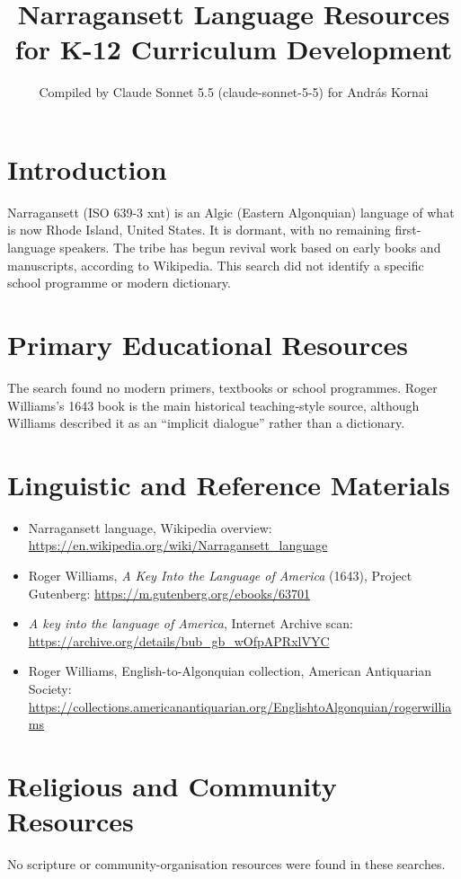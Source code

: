 \documentclass[12pt]{article}
\title{Narragansett Language Resources for K-12 Curriculum Development}
\author{Compiled by Claude Sonnet 5.5 (claude-sonnet-5-5) for Andr\'as Kornai}
\date{}
\begin{document}
\maketitle

\section{Introduction}
Narragansett (ISO 639-3 xnt) is an Algic (Eastern Algonquian) language of what is now Rhode Island, United States. It is dormant, with no remaining first-language speakers. The tribe has begun revival work based on early books and manuscripts, according to Wikipedia. This search did not identify a specific school programme or modern dictionary.

\section{Primary Educational Resources}
The search found no modern primers, textbooks or school programmes. Roger Williams's 1643 book is the main historical teaching-style source, although Williams described it as an ``implicit dialogue'' rather than a dictionary.

\section{Linguistic and Reference Materials}
\begin{itemize}
\item Narragansett language, Wikipedia overview: \url{https://en.wikipedia.org/wiki/Narragansett_language}
\item Roger Williams, \emph{A Key Into the Language of America} (1643), Project Gutenberg: \url{https://m.gutenberg.org/ebooks/63701}
\item \emph{A key into the language of America}, Internet Archive scan: \url{https://archive.org/details/bub_gb_wOfpAPRxlVYC}
\item Roger Williams, English-to-Algonquian collection, American Antiquarian Society: \url{https://collections.americanantiquarian.org/EnglishtoAlgonquian/rogerwilliams}
\end{itemize}

\section{Religious and Community Resources}
No scripture or community-organisation resources were found in these searches.
\end{document}
